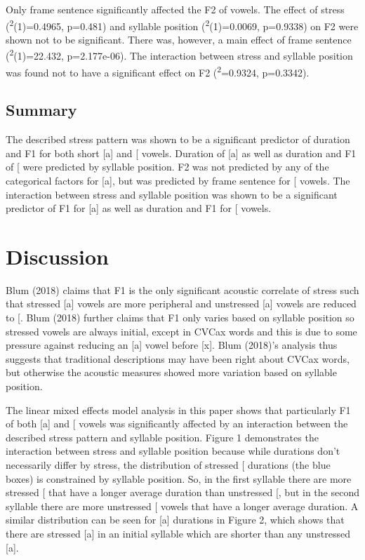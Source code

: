 \documentclass[floatsintext,man]{apa6}
\theoremstyle{definition}
\theoremstyle{definition}
\theoremstyle{definition}
\theoremstyle{remark}
\begin{document}
Only frame sentence significantly affected the F2 of  vowels.
The effect of stress (\textsuperscript{2}(1)=0.4965, p=0.481)
and syllable position (\textsuperscript{2}(1)=0.0069,
p=0.9338) on F2 were shown not to be significant. There was, however, a
main effect of frame sentence (\textsuperscript{2}(1)=22.432,
p=2.177e-06). The interaction between stress and syllable position was
found not to have a significant effect on  F2
(\textsuperscript{2}=0.9324, p=0.3342).

\subsection{Summary}\label{summary}

The described stress pattern was shown to be a significant predictor of
duration and F1 for both short {[}a{]} and {[}\textipa{@}{]} vowels.
Duration of {[}a{]} as well as duration and F1 of {[}\textipa{@}{]} were
predicted by syllable position. F2 was not predicted by any of the
categorical factors for {[}a{]}, but was predicted by frame sentence for
{[}\textipa{@}{]} vowels. The interaction between stress and syllable
position was shown to be a significant predictor of F1 for {[}a{]} as
well as duration and F1 for {[}\textipa{@}{]} vowels.

\section{Discussion}\label{discussion}

Blum (2018) claims that F1 is the only significant acoustic correlate of
stress such that stressed {[}a{]} vowels are more peripheral and
unstressed {[}a{]} vowels are reduced to {[}\textipa{@}{]}. Blum (2018)
further claims that F1 only varies based on syllable position so
stressed vowels are always initial, except in CVCax words and this is
due to some pressure against reducing an {[}a{]} vowel before {[}x{]}.
Blum (2018)'s analysis thus suggests that traditional descriptions may
have been right about CVCax words, but otherwise the acoustic measures
showed more variation based on syllable position.

The linear mixed effects model analysis in this paper shows that
particularly F1 of both {[}a{]} and {[}\textipa{@}{]} vowels was
significantly affected by an interaction between the described stress
pattern and syllable position. Figure 1 demonstrates the interaction
between stress and syllable position because while durations don't
necessarily differ by stress, the distribution of stressed
{[}\textipa{@}{]} durations (the blue boxes) is constrained by syllable
position. So, in the first syllable there are more stressed
{[}\textipa{@}{]} that have a longer average duration than unstressed
{[}\textipa{@}{]}, but in the second syllable there are more unstressed
{[}\textipa{@}{]} vowels that have a longer average duration. A similar
distribution can be seen for {[}a{]} durations in Figure 2, which shows
that there are stressed {[}a{]} in an initial syllable which are shorter
than any unstressed {[}a{]}.
\end{document}
